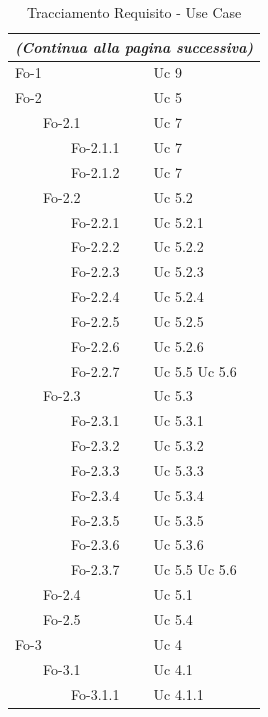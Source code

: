 {{\begin{longtable}{|p{5cm}|p{5cm}|}
\caption{Tracciamento Requisito - Use Case}\\
\hline
\endfirsthead
\multicolumn{2}{r}{\textit{(Continua alla pagina successiva)}}
\endfoot
\multicolumn{2}{l}{\textit{(Continua dalla pagina precedente)}}
\endhead
\hline
\endlastfoot
\textbf{Codice Requisito}& \textbf{Codice Use Case}\\
\hline
Fo-1 & Uc 9\\
\hline
Fo-2 & Uc 5\\
\hline
\ \ \ \ Fo-2.1 & Uc 7\\
\hline
\ \ \ \ \ \ \ \ Fo-2.1.1 & Uc 7\\
\hline
\ \ \ \ \ \ \ \ Fo-2.1.2 & Uc 7\\
\hline
\ \ \ \ Fo-2.2 & Uc 5.2\\
\hline
\ \ \ \ \ \ \ \ Fo-2.2.1 & Uc 5.2.1\\
\hline
\ \ \ \ \ \ \ \ Fo-2.2.2 & Uc 5.2.2\\
\hline
\ \ \ \ \ \ \ \ Fo-2.2.3 & Uc 5.2.3\\
\hline
\ \ \ \ \ \ \ \ Fo-2.2.4 & Uc 5.2.4\\
\hline
\ \ \ \ \ \ \ \ Fo-2.2.5 & Uc 5.2.5\\
\hline
\ \ \ \ \ \ \ \ Fo-2.2.6 & Uc 5.2.6\\
\hline
\ \ \ \ \ \ \ \ Fo-2.2.7 & Uc 5.5 \newline Uc 5.6\\
\hline
\ \ \ \ Fo-2.3 & Uc 5.3\\
\hline
\ \ \ \ \ \ \ \ Fo-2.3.1 & Uc 5.3.1\\
\hline
\ \ \ \ \ \ \ \ Fo-2.3.2 & Uc 5.3.2\\
\hline
\ \ \ \ \ \ \ \ Fo-2.3.3 & Uc 5.3.3\\
\hline
\ \ \ \ \ \ \ \ Fo-2.3.4 & Uc 5.3.4\\
\hline
\ \ \ \ \ \ \ \ Fo-2.3.5 & Uc 5.3.5\\
\hline
\ \ \ \ \ \ \ \ Fo-2.3.6 & Uc 5.3.6\\
\hline
\ \ \ \ \ \ \ \ Fo-2.3.7 & Uc 5.5 \newline Uc 5.6\\
\hline
\ \ \ \ Fo-2.4 & Uc 5.1\\
\hline
\ \ \ \ Fo-2.5 & Uc 5.4\\
\hline
Fo-3 & Uc 4\\
\hline
\ \ \ \ Fo-3.1 & Uc 4.1\\
\hline
\ \ \ \ \ \ \ \ Fo-3.1.1 & Uc 4.1.1\\

\end{longtable}}}
